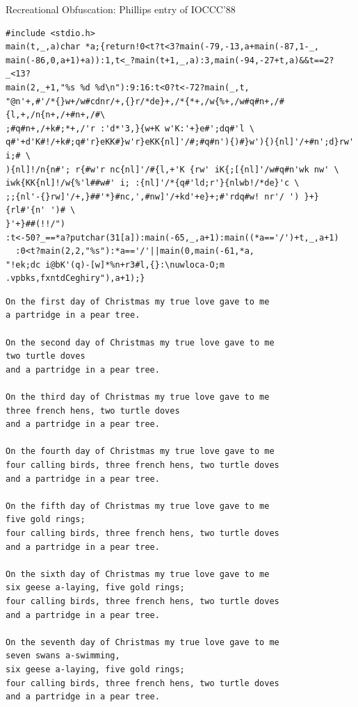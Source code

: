 \begin{frame}[fragile]{Recreational Obfuscation: Phillips entry of IOCCC'88}
  \begin{Verbatim}[fontsize=\footnotesize,frame=single,label=Program code]
#include <stdio.h>
main(t,_,a)char *a;{return!0<t?t<3?main(-79,-13,a+main(-87,1-_,
main(-86,0,a+1)+a)):1,t<_?main(t+1,_,a):3,main(-94,-27+t,a)&&t==2?_<13?
main(2,_+1,"%s %d %d\n"):9:16:t<0?t<-72?main(_,t,
"@n'+,#'/*{}w+/w#cdnr/+,{}r/*de}+,/*{*+,/w{%+,/w#q#n+,/#{l,+,/n{n+,/+#n+,/#\
;#q#n+,/+k#;*+,/'r :'d*'3,}{w+K w'K:'+}e#';dq#'l \
q#'+d'K#!/+k#;q#'r}eKK#}w'r}eKK{nl]'/#;#q#n'){)#}w'){){nl]'/+#n';d}rw' i;# \
){nl]!/n{n#'; r{#w'r nc{nl]'/#{l,+'K {rw' iK{;[{nl]'/w#q#n'wk nw' \
iwk{KK{nl]!/w{%'l##w#' i; :{nl]'/*{q#'ld;r'}{nlwb!/*de}'c \
;;{nl'-{}rw]'/+,}##'*}#nc,',#nw]'/+kd'+e}+;#'rdq#w! nr'/ ') }+}{rl#'{n' ')# \
}'+}##(!!/")
:t<-50?_==*a?putchar(31[a]):main(-65,_,a+1):main((*a=='/')+t,_,a+1)
  :0<t?main(2,2,"%s"):*a=='/'||main(0,main(-61,*a,
"!ek;dc i@bK'(q)-[w]*%n+r3#l,{}:\nuwloca-O;m .vpbks,fxntdCeghiry"),a+1);}
  \end{Verbatim}    
  \begin{minipage}{.5\linewidth}
  \begin{Verbatim}[fontsize=\tiny,frame=single,label=Output]
On the first day of Christmas my true love gave to me
a partridge in a pear tree.

On the second day of Christmas my true love gave to me
two turtle doves
and a partridge in a pear tree.

On the third day of Christmas my true love gave to me
three french hens, two turtle doves
and a partridge in a pear tree.

On the fourth day of Christmas my true love gave to me
four calling birds, three french hens, two turtle doves
and a partridge in a pear tree.

On the fifth day of Christmas my true love gave to me
five gold rings;
four calling birds, three french hens, two turtle doves
and a partridge in a pear tree.

On the sixth day of Christmas my true love gave to me
six geese a-laying, five gold rings;
four calling birds, three french hens, two turtle doves
and a partridge in a pear tree.

On the seventh day of Christmas my true love gave to me
seven swans a-swimming,
six geese a-laying, five gold rings;
four calling birds, three french hens, two turtle doves
and a partridge in a pear tree.


\end{Verbatim}
\end{minipage}
\end{frame}
